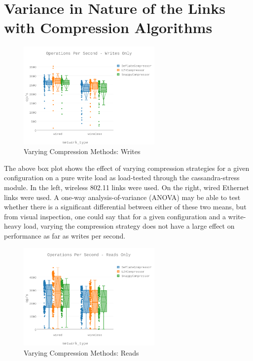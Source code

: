 \section{Variance in Nature of the Links with Compression Algorithms}

\begin{figure}[h]
\includegraphics[width=7cm]{Figures/figures-cs1_fig1.pdf}

\caption{Varying Compression Methods: Writes}

\label{fig:res}
\end{figure}
	The above box plot shows the effect of varying compression strategies for a given configuration on a pure write load as load-tested through the cassandra-stress module.  In the left, wireless 802.11 links were used.  On the right, wired Ethernet links were used.  A one-way analysis-of-variance (ANOVA) may be able to test whether there is a significant differential between either of these two means, but from visual inspection, one could say that for a given configuration and a write-heavy load, varying the compression strategy does not have a large effect on performance as far as writes per second.
\begin{figure}[h]
\includegraphics[width=7cm]{Figures/figures-cs1_fig2.pdf}

\caption{Varying Compression Methods: Reads}

\label{fig:res}
\end{figure}
